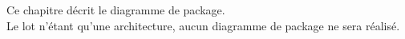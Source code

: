
Ce chapitre décrit le diagramme de package. \\

Le lot n'étant qu'une architecture, aucun diagramme de package ne sera réalisé.